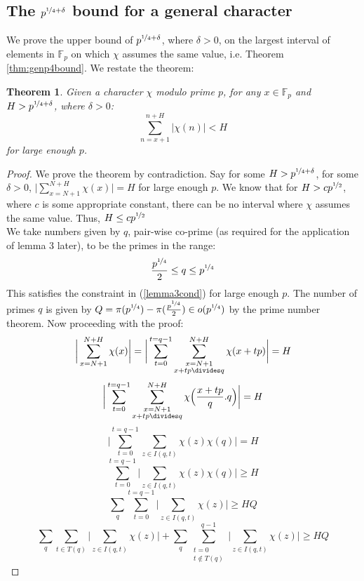 \documentclass{report}
\newtheorem*{theorem*}{Theorem}
\begin{document}
\subsection{The $p^{\nicefrac{1}{4}+\delta}$ bound for a general character}
We prove the upper bound of $p^{\nicefrac{1}{4}+\delta}$, where $\delta>0$, on the largest interval of elements in $\mathbb{F}_p$ on which $\chi$ assumes the same value, i.e. Theorem \ref{thm:genp4bound}. We restate the theorem:
\begin{theorem*}
Given a character $\chi$ modulo prime $p$, for any $x\in\mathbb{F}_p$ and $H>p^{\nicefrac{1}{4}+\delta}$, where $\delta>0$:
\[\sum\limits_{n=x+1}^{n+H}\lvert\chi(n)\rvert<H\]
for large enough $p$.
\end{theorem*}
\begin{proof}
We prove the theorem by contradiction. Say for some $H>p^{\nicefrac{1}{4}+\delta}$, for some $\delta>0$, $\Big \lvert \sum\limits_{x=N+1}^{N+H}\chi(x)\Big \rvert=H$ for large enough $p$. We know that for $H>cp^{\nicefrac{1}{2}}$, where $c$ is some appropriate constant, there can be no interval where $\chi$ assumes the same value. Thus, $H\leq cp^{\nicefrac{1}{2}}$\\
We take numbers given by $q$, pair-wise co-prime (as required for the application of lemma 3 later), to be the primes in the range:
$$\frac{p^{\nicefrac{1}{4}}}{2} \leq q \leq p^{\nicefrac{1}{4}}$$
This satisfies the constraint in (\ref{lemma3cond}) for large enough $p$. The number of primes $q$ is given by $Q=\pi(p^{\nicefrac{1}{4}})-\pi(\frac{p^{\nicefrac{1}{4}}}{2})\in o(p^{\nicefrac{1}{4}})$ by the prime number theorem. Now proceeding with the proof:
\[\bigg \lvert\sum\limits_{x=N+1}^{N+H}\chi(x)\bigg \rvert=\bigg \lvert\sum\limits_{t=0}^{t=q-1}\sum\limits_{\substack{x=N+1\\x+tp\divides q}}^{N+H}\chi(x+tp)\bigg \rvert=H \]
$$\bigg \lvert\sum\limits_{t=0}^{t=q-1}\sum\limits_{\substack{x=N+1\\x+tp\divides q}}^{N+H} \chi \Big(\frac{x+tp}{q}.q\Big)\bigg \rvert=H$$
$$\bigg \lvert\sum\limits_{t=0}^{t=q-1}\sum\limits_{z\in I(q,t)}\chi(z)\chi(q)\bigg \rvert=H$$
$$\sum\limits_{t=0}^{t=q-1}\bigg \lvert\sum\limits_{z\in I(q,t)}\chi(z)\chi(q)\bigg \rvert \geq H$$
$$\sum_q\sum\limits_{t=0}^{t=q-1}\bigg \lvert\sum\limits_{z\in I(q,t)}\chi(z)\bigg \rvert \geq HQ$$
\begin{equation} \label{separationgen}
\sum_q\sum\limits_{t\in T(q)}\bigg \lvert\sum\limits_{z\in I(q,t)}\chi(z)\bigg \rvert+\sum_q\sum\limits_{\substack{t=0\\t\not \in T(q)}}^{q-1}\bigg \lvert\sum\limits_{z\in I(q,t)}\chi(z)\bigg \rvert \geq HQ

\end{equation}
\end{proof}
\end{document}
